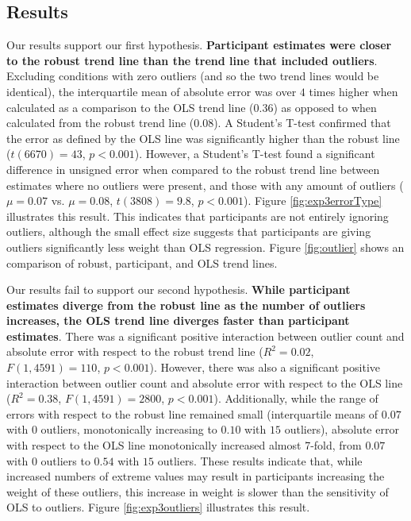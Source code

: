 \documentclass{sigchi}
\begin{document}
\subsection{Results}

\expThreeErrorFig

\expThreeOutliersFig

Our results support our first hypothesis. \textbf{Participant estimates were closer to the robust trend line than the trend line that included outliers}. Excluding conditions with zero outliers (and so the two trend lines would be identical), the interquartile mean of absolute error was over $4$ times higher when calculated as a comparison to the OLS trend line ($0.36$) as opposed to when calculated from the robust trend line ($0.08$). A Student's T-test confirmed that the error as defined by the OLS line was significantly higher than the robust line ($t(6670)= 43$, $p<0.001$). However, a Student's T-test found a significant difference in unsigned error when compared to the robust trend line between estimates where no outliers were present, and those with any amount of outliers ($\mu=0.07$ vs. $\mu=0.08$, $t(3808) = 9.8$, $p<0.001$). Figure \ref{fig:exp3errorType} illustrates this result. This indicates that participants are not entirely ignoring outliers, although the small effect size suggests that participants are giving outliers significantly less weight than OLS regression. Figure \ref{fig:outlier} shows an comparison of robust, participant, and OLS trend lines.


Our results fail to support our second hypothesis. \textbf{While participant estimates diverge from the robust line as the number of outliers increases, the OLS trend line diverges faster than participant estimates}. There was a significant positive interaction between outlier count and absolute error with respect to the robust trend line ($R^2 = 0.02$, $F(1,4591)=110$, $p<0.001$). However, there was also a significant positive interaction between outlier count and absolute error with respect to the OLS line  ($R^2 = 0.38$, $F(1,4591)=2800$, $p<0.001$). Additionally, while the range of errors with respect to the robust line remained small (interquartile means of $0.07$ with $0$ outliers, monotonically increasing to $0.10$ with $15$ outliers), absolute error with respect to the OLS line monotonically increased almost 7-fold, from $0.07$ with $0$ outliers to $0.54$ with $15$ outliers. These results indicate that, while increased numbers of extreme values may result in participants increasing the weight of these outliers, this increase in weight is slower than the sensitivity of OLS to outliers.  Figure \ref{fig:exp3outliers} illustrates this result.
\end{document}
